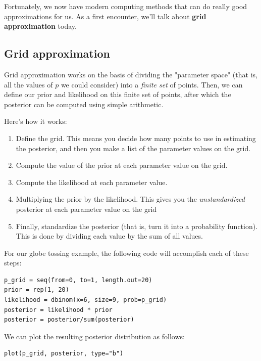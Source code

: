 \documentclass[11pt]{article}
\begin{document}
Fortunately, we now have modern computing methods that can do really good approximations for us.  As a first encounter, we'll talk about \textbf{grid approximation} today.

\subsection*{Grid approximation}
\label{sec-2-1}

Grid approximation works on the basis of dividing the "parameter space" (that is, all the values of $p$ we could consider) into a \emph{finite set} of points.  Then, we can define our prior and likelihood on this finite set of points, after which the posterior can be computed using simple arithmetic.  

Here's how it works:

\begin{enumerate}
\item Define the grid. This means you decide how many points to use in estimating the posterior, and then you make a list of the parameter values on the grid.
\item Compute the value of the prior at each parameter value on the grid.
\item Compute the likelihood at each parameter value.
\item Multiplying the prior by the likelihood.  This gives you the \emph{unstandardized} posterior at each parameter value on the grid
\item Finally, standardize the posterior (that is, turn it into a probability function).  This is done by dividing each value by the sum of all values.
\end{enumerate}

For our globe tossing example, the following code will accomplish each of these steps:

\begin{verbatim}
p_grid = seq(from=0, to=1, length.out=20)
prior = rep(1, 20)
likelihood = dbinom(x=6, size=9, prob=p_grid)
posterior = likelihood * prior
posterior = posterior/sum(posterior)
\end{verbatim}

We can plot the resulting posterior distribution as follows:

\begin{verbatim}
plot(p_grid, posterior, type="b")
\end{verbatim}
\end{document}
